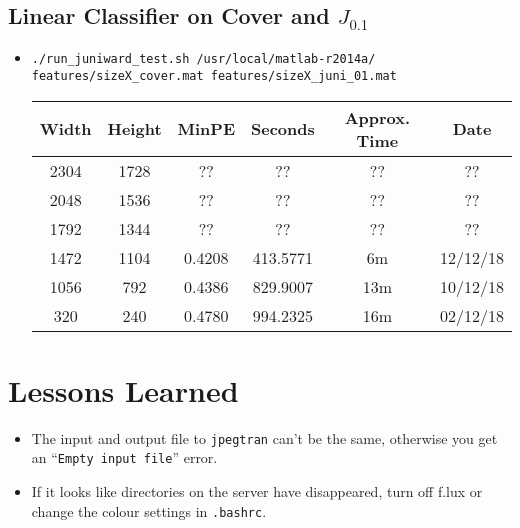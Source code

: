 \documentclass[11pt,a4paper]{report}
\begin{document}
\subsection{Linear Classifier on Cover and $J_{0.1}$}
\begin{itemize}
\item \texttt{./run\_juniward\_test.sh /usr/local/matlab-r2014a/} \\
         \texttt{features/sizeX\_cover.mat features/sizeX\_juni\_01.mat}
  \begin{center}
  \begin{tabular}{ c c | c | c c c }
  Width & Height & MinPE & Seconds & Approx. Time & Date \\ \hline
  2304 & 1728 & ?? & ?? & ?? & ?? \\
  2048 & 1536 & ?? & ?? & ?? & ?? \\
  1792 & 1344 & ?? & ?? & ?? & ?? \\
  1472 & 1104 & 0.4208 & 413.5771 & 6m & 12/12/18 \\
  1056 & 792 & 0.4386 & 829.9007 & 13m & 10/12/18 \\
  320 & 240 & 0.4780 & 994.2325 & 16m & 02/12/18 \\
  \end{tabular}
  \end{center}
\end{itemize}


\section{Lessons Learned}
\label{sec:lessons-learned}

\begin{itemize}

\item The input and output file to \texttt{jpegtran} can't be the same, otherwise you get an ``\texttt{Empty input file}'' error.

\item If it looks like directories on the server have disappeared, turn off f.lux or change the colour settings in \texttt{.bashrc}.

\end{itemize}
\end{document}
